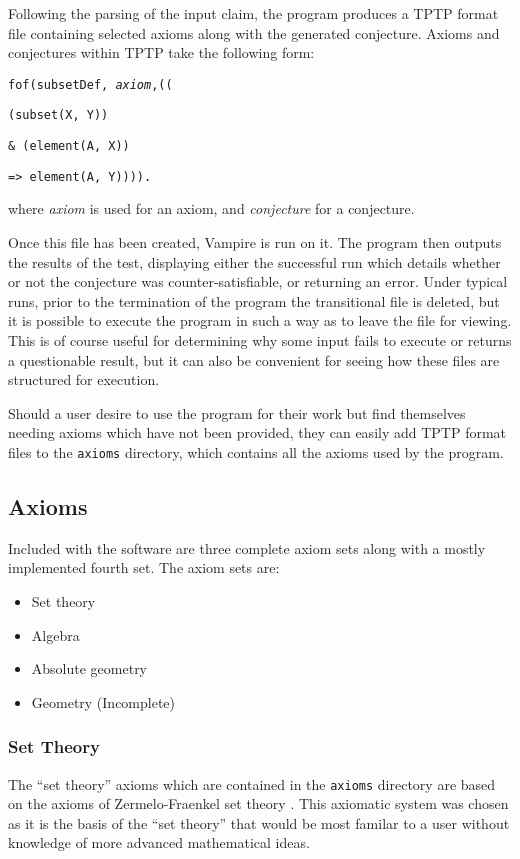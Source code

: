 Following the parsing of the input claim, the program produces a TPTP format file containing selected axioms along with the generated conjecture. Axioms and conjectures within TPTP take the following form:

\texttt{fof(subsetDef, \textit{axiom},((}

\texttt{(subset(X, Y))}

\texttt{\& (element(A, X))}

\texttt{=> element(A, Y)))).}

\noindent
where \textit{axiom} is used for an axiom, and \textit{conjecture} for a conjecture.

Once this file has been created, Vampire is run on it. The program then outputs the results of the test, displaying either the successful run which details whether or not the conjecture was counter-satisfiable, or returning an error. Under typical runs, prior to the termination of the program the transitional file is deleted, but it is possible to execute the program in such a way as to leave the file for viewing. This is of course useful for determining why some input fails to execute or returns a questionable result, but it can also be convenient for seeing how these files are structured for execution.

Should a user desire to use the program for their work but find themselves needing axioms which have not been provided, they can easily add TPTP format files to the \texttt{axioms} directory, which contains all the axioms used by the program.

\subsection{Axioms}

Included with the software are three complete axiom sets along with a mostly implemented fourth set. The axiom sets are:
\begin{itemize}
	\item Set theory
	\item Algebra
	\item Absolute geometry
	\item Geometry (Incomplete)
\end{itemize}

\subsubsection{Set Theory}

The ``set theory'' axioms which are contained in the \texttt{axioms} directory are based on the axioms of Zermelo-Fraenkel set theory \cite{zermelo}. This axiomatic system was chosen as it is the basis of the ``set theory'' that would be most familar to a user without knowledge of more advanced mathematical ideas.

